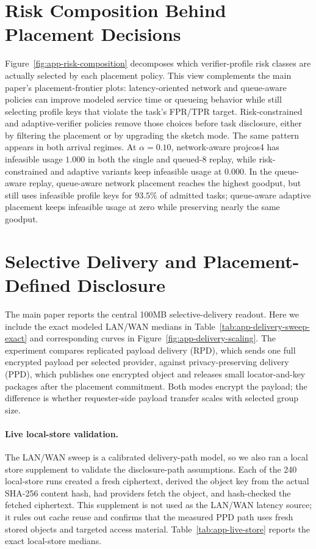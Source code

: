 \documentclass[sigplan,screen,review,anonymous]{acmart}
\begin{document}
\section{Risk Composition Behind Placement Decisions}
\label{app:placement-risk-composition}

Figure~\ref{fig:app-risk-composition} decomposes which verifier-profile risk
classes are actually selected by each placement policy. This view complements
the main paper's placement-frontier plots: latency-oriented network and
queue-aware policies can improve modeled service time or queueing behavior
while still selecting profile keys that violate the task's FPR/TPR target.
Risk-constrained and adaptive-verifier policies remove those choices before
task disclosure, either by filtering the placement or by upgrading the sketch
mode. The same pattern appears in both arrival regimes. At
\(\alpha=0.10\), network-aware projcos4 has infeasible usage \(1.000\) in
both the single and queued-8 replay, while risk-constrained and adaptive
variants keep infeasible usage at \(0.000\). In the queue-aware replay,
queue-aware network placement reaches the highest goodput, but still uses
infeasible profile keys for \(93.5\%\) of admitted tasks; queue-aware adaptive
placement keeps infeasible usage at zero while preserving nearly the same
goodput.


\section{Selective Delivery and Placement-Defined Disclosure}
\label{app:delivery-scaling}

The main paper reports the central 100MB selective-delivery readout. Here we
include the exact modeled LAN/WAN medians in
Table~\ref{tab:app-delivery-sweep-exact} and corresponding curves in
Figure~\ref{fig:app-delivery-scaling}. The experiment compares replicated
payload delivery (RPD), which sends one full encrypted payload per selected
provider, against privacy-preserving delivery (PPD), which publishes one
encrypted object and releases small locator-and-key packages after the
placement commitment. Both modes encrypt the payload; the difference is
whether requester-side payload transfer scales with selected group size.



\paragraph{Live local-store validation.}
The LAN/WAN sweep is a calibrated delivery-path model, so we also ran a local
store supplement to validate the disclosure-path assumptions. Each of the 240
local-store runs created a fresh ciphertext, derived the object key from the
actual SHA-256 content hash, had providers fetch the object, and hash-checked
the fetched ciphertext. This supplement is not used as the LAN/WAN latency
source; it rules out cache reuse and confirms that the measured PPD path uses
fresh stored objects and targeted access material. Table~\ref{tab:app-live-store}
reports the exact local-store medians.
\end{document}
